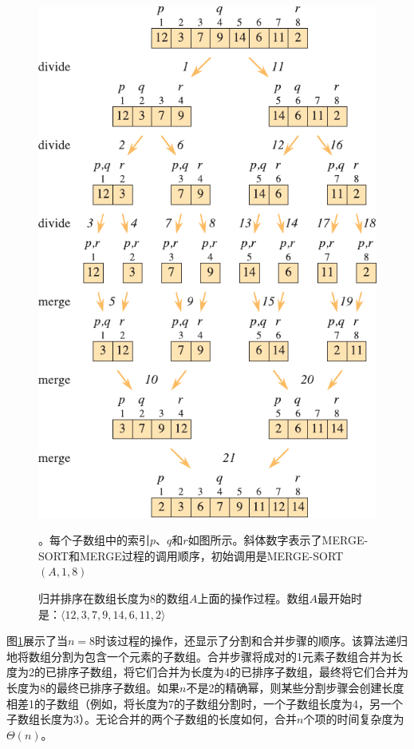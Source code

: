\documentclass[lang=cn,newtx,10pt,scheme=chinese]{elegantbook}
\begin{document}
\begin{figure}[htbp]
    \centering
    \includegraphics{算法导论第四版插图/第二章/归并排序完整过程示意图.pdf}
    \caption{归并排序在数组长度为8的数组$A$上面的操作过程。数组$A$最开始时是：$\langle{12,3,7,9,14,6,11,2}\rangle$}。每个子数组中的索引$p$、$q$和$r$如图所示。斜体数字表示了MERGE-SORT和MERGE过程的调用顺序，初始调用是MERGE-SORT$(A,1,8)$
    \label{fig:归并排序完整过程示意图}
\end{figure}

图\ref{fig:归并排序完整过程示意图}展示了当$n=8$时该过程的操作，还显示了分割和合并步骤的顺序。该算法递归地将数组分割为包含一个元素的子数组。合并步骤将成对的1元素子数组合并为长度为2的已排序子数组，将它们合并为长度为4的已排序子数组，最终将它们合并为长度为8的最终已排序子数组。如果$n$不是2的精确幂，则某些分割步骤会创建长度相差1的子数组（例如，将长度为7的子数组分割时，一个子数组长度为4，另一个子数组长度为3）。无论合并的两个子数组的长度如何，合并$n$个项的时间复杂度为$\Theta(n)$。
\end{document}
